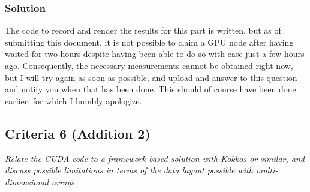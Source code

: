 \documentclass[10pt]{article}
\begin{document}
\subsubsection{Solution}
{\color{yellow}The code to record and render the results for this part is written, but as of submitting this document, it is not possible to claim a GPU node after having waited for two hours despite having been able to do so with ease just a few hours ago. Consequently, the necessary measurements cannot be obtained right now, but I will try again as soon as possible, and upload and answer to this question and notify you when that has been done. This should of course have been done earlier, for which I humbly apologize.}
\subsection{Criteria 6 (Addition 2)}
\textit{Relate the CUDA code to a framework-based solution with Kokkos or similar, and discuss possible limitations in terms of the data layout possible with multi-dimensional arrays.}
\end{document}
